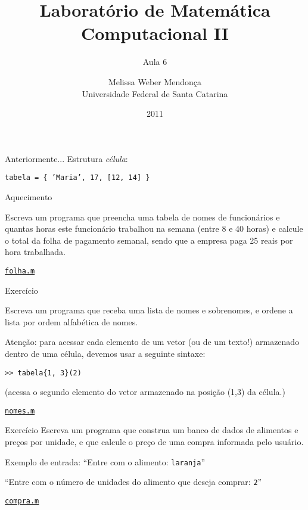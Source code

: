 \documentclass[hyperref={pdfpagelabels=false}]{beamer}
\title{Laboratório de Matemática Computacional II}
\subtitle{Aula 6}
\author[M. Weber Mendonça]{Melissa Weber Mendonça\\
Universidade Federal de Santa Catarina}
\date{2011}
\begin{document}
\setmonofont{Inconsolata}

\begin{frame}
  \titlepage
\end{frame}

\begin{frame}{Anteriormente...}
  Estrutura \emph{célula}:
  \begin{center}
    \texttt{tabela = \{ 'Maria', 17, [12, 14] \}}
  \end{center}
\end{frame}

\begin{frame}{Aquecimento}

  Escreva um programa que preencha uma tabela de nomes de funcionários e quantas horas este funcionário trabalhou na semana (entre 8 e 40 horas) e calcule o total da folha de pagamento semanal, sendo que a empresa paga 25 reais por hora trabalhada.

  \begin{center}
    \href{listings/folha.m}{\underline{\texttt{folha.m}}}
  \end{center}
\end{frame}

\begin{frame}{Exercício}

  Escreva um programa que receba uma lista de nomes e sobrenomes, e ordene a lista por ordem alfabética de nomes.

  Atenção: para acessar cada elemento de um vetor (ou de um texto!) armazenado dentro de uma célula, devemos usar a seguinte sintaxe:

  \begin{center}
    \texttt{>> tabela\{1, 3\}(2)}
  \end{center}

  (acessa o segundo elemento do vetor armazenado na posição (1,3) da célula.)

  \begin{center}
    \href{listings/nomes.m}{\underline{\texttt{nomes.m}}}
  \end{center}
\end{frame}

\begin{frame}{Exercício}
  Escreva um programa que construa um banco de dados de alimentos e preços por unidade, e que calcule o preço de uma compra informada pelo usuário.

  Exemplo de entrada:
  \vfill
  ``Entre com o alimento: {\texttt{laranja}}''
  
  ``Entre com o número de unidades do alimento que deseja comprar: {\texttt{2}}''
  \vfill
  \begin{center}
    \href{listings/compra.m}{\underline{\texttt{compra.m}}}
  \end{center}
\end{frame}
\end{document}
